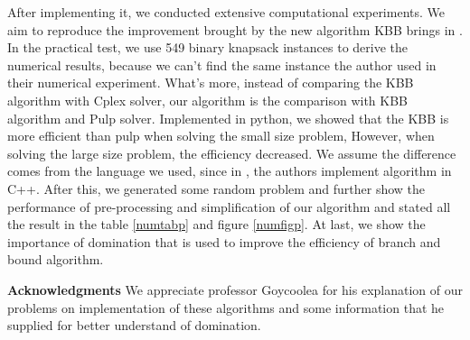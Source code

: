 \documentclass[a4paper,11pt]{article}
\begin{document}
After implementing it, we conducted extensive computational experiments. We aim to reproduce the improvement brought by the new algorithm KBB
brings in \cite{fukasawa2011exact}. In the practical test, we use 549 binary knapsack instances to derive the numerical results, because we can't find the same instance the author used in their numerical experiment. What's more, instead of comparing the KBB algorithm with Cplex solver, our algorithm is the comparison with KBB algorithm and Pulp solver. Implemented in python, we showed that the KBB is more efficient than pulp when solving the small size problem, However, when solving the large size problem, the efficiency decreased. We assume the difference comes from the language we used, since in \cite{fukasawa2011exact}, the authors implement algorithm in C++.  After this, we generated some random problem and further show the performance of pre-processing and simplification of our algorithm and stated all the result in the table \ref{numtabp} and figure \ref{numfigp}. At last, we show the importance of domination that is used to improve the efficiency of branch and bound algorithm.

\textbf{Acknowledgments} We appreciate professor Goycoolea for his explanation of our problems on implementation of these algorithms and some information that he supplied for better understand of domination.  

 

 
\end{document}
